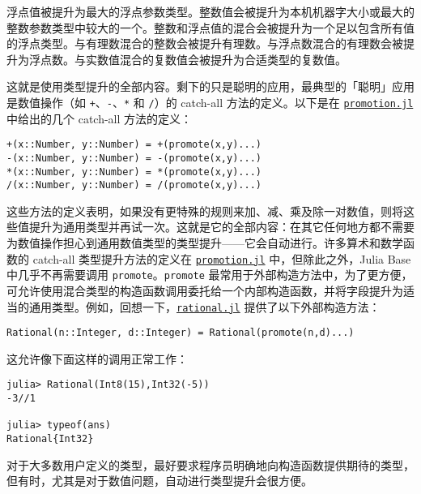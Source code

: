 浮点值被提升为最大的浮点参数类型。整数值会被提升为本机机器字大小或最大的整数参数类型中较大的一个。整数和浮点值的混合会被提升为一个足以包含所有值的浮点类型。与有理数混合的整数会被提升有理数。与浮点数混合的有理数会被提升为浮点数。与实数值混合的复数值会被提升为合适类型的复数值。



这就是使用类型提升的全部内容。剩下的只是聪明的应用，最典型的「聪明」应用是数值操作（如 \texttt{+}、\texttt{-}、\texttt{*} 和 \texttt{/}）的 catch-all 方法的定义。以下是在 \href{https://github.com/JuliaLang/julia/blob/master/base/promotion.jl}{\texttt{promotion.jl}} 中给出的几个 catch-all 方法的定义：




\begin{verbatim}
+(x::Number, y::Number) = +(promote(x,y)...)
-(x::Number, y::Number) = -(promote(x,y)...)
*(x::Number, y::Number) = *(promote(x,y)...)
/(x::Number, y::Number) = /(promote(x,y)...)
\end{verbatim}



这些方法的定义表明，如果没有更特殊的规则来加、减、乘及除一对数值，则将这些值提升为通用类型并再试一次。这就是它的全部内容：在其它任何地方都不需要为数值操作担心到通用数值类型的类型提升——它会自动进行。许多算术和数学函数的 catch-all 类型提升方法的定义在 \href{https://github.com/JuliaLang/julia/blob/master/base/promotion.jl}{\texttt{promotion.jl}} 中，但除此之外，Julia Base 中几乎不再需要调用 \texttt{promote}。\texttt{promote} 最常用于外部构造方法中，为了更方便，可允许使用混合类型的构造函数调用委托给一个内部构造函数，并将字段提升为适当的通用类型。例如，回想一下，\href{https://github.com/JuliaLang/julia/blob/master/base/rational.jl}{\texttt{rational.jl}} 提供了以下外部构造方法：




\begin{verbatim}
Rational(n::Integer, d::Integer) = Rational(promote(n,d)...)
\end{verbatim}



这允许像下面这样的调用正常工作：




\begin{verbatim}
julia> Rational(Int8(15),Int32(-5))
-3//1

julia> typeof(ans)
Rational{Int32}
\end{verbatim}



对于大多数用户定义的类型，最好要求程序员明确地向构造函数提供期待的类型，但有时，尤其是对于数值问题，自动进行类型提升会很方便。



